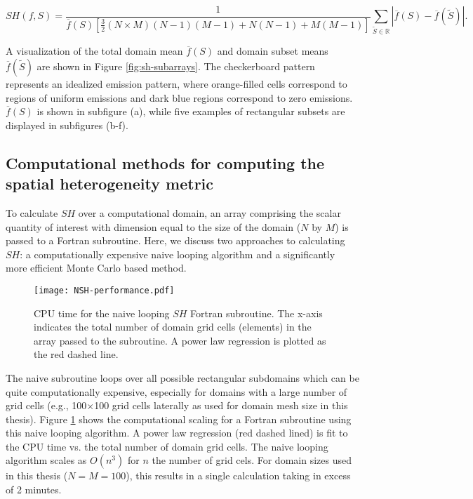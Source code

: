 \begin{equation}
SH(f, S) = \frac{1}{\overline{f}(S)\left[\frac{3}{2}(N\times M)(N-1)(M-1) + N(N-1) + M(M-1)\right]}\sum_{\tilde{S}\in \mathbb{R}}|\overline{f}(S) - \overline{f}(\tilde{S})|.
\end{equation}

A visualization of the total domain mean $\overline{f}(S)$ and domain subset means $\overline{f}(\tilde{S})$ are shown in Figure \ref{fig:sh-subarrays}. The checkerboard pattern represents an idealized emission pattern, where orange-filled cells correspond to regions of uniform emissions and dark blue regions correspond to zero emissions. $\overline{f}(S)$ is shown in subfigure (a), while five examples of rectangular subsets are displayed in subfigures (b-f).


\subsection{Computational methods for computing the spatial heterogeneity metric}
To calculate $SH$ over a computational domain, an array comprising the scalar quantity of interest with dimension equal to the size of the domain ($N$ by $M$) is passed to a Fortran subroutine. Here, we discuss two approaches to calculating $SH$: a computationally expensive naive looping algorithm and a significantly more efficient Monte Carlo based method.

\begin{figure}[h]
	\centering
	\texttt{[image: NSH-performance.pdf]}
	\caption{CPU time for the naive looping $SH$ Fortran subroutine. The x-axis indicates the total number of domain grid cells (elements) in the array passed to the subroutine. A power law regression is plotted as the red dashed line.}
	\label{fig:nsh-performance}
\end{figure}

The naive subroutine loops over all possible rectangular subdomains which can be quite computationally expensive, especially for domains with a large number of grid cells (e.g., 100$\times$100 grid cells laterally as used for domain mesh size in this thesis). Figure \ref{fig:nsh-performance} shows the computational scaling for a Fortran subroutine using this naive looping algorithm. A power law regression (red dashed lined) is fit to the CPU time vs. the total number of domain grid cells. The naive looping algorithm scales as $O(n^3)$ for $n$ the number of grid cels. For domain sizes used in this thesis ($N=M=100$), this results in a single calculation taking in excess of 2 minutes.

